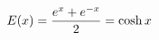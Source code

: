 \documentclass[preview]{standalone}
\begin{document}
\begin{align*}
\special{dvisvgm:raw <g id='unique000'>}E(x)=\frac{e^x+e^{-x}}{2}=\cosh x\special{dvisvgm:raw </g>}
\end{align*}
\end{document}
